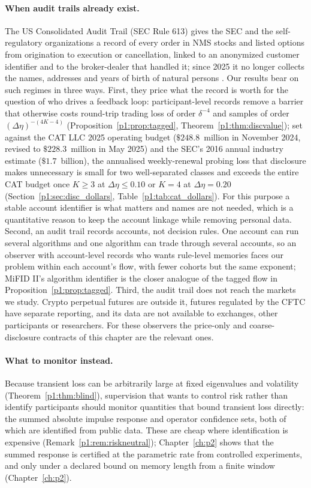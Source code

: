 \paragraph{When audit trails already exist.} The US Consolidated Audit Trail (SEC Rule 613) gives the SEC and the self-regulatory organizations a record of every order in NMS stocks and listed options from origination to execution or cancellation, linked to an anonymized customer identifier and to the broker-dealer that handled it; since 2025 it no longer collects the names, addresses and years of birth of natural persons \citep{p1:sec2012,p1:sec2016,p1:sec2024cat,p1:sec2025}. Our results bear on such regimes in three ways. First, they price what the record is worth for the question of who drives a feedback loop: participant-level records remove a barrier that otherwise costs round-trip trading loss of order $\delta^{-4}$ and samples of order $(\Delta\eta)^{-(4K-4)}$ (Proposition~\ref{p1:prop:tagged}, Theorem~\ref{p1:thm:discvalue}); set against the CAT LLC 2025 operating budget ($\$248.8$~million in November 2024, revised to $\$228.3$~million in May 2025) and the SEC's 2016 annual industry estimate ($\$1.7$~billion), the annualised weekly-renewal probing loss that disclosure makes unnecessary is small for two well-separated classes and exceeds the entire CAT budget once $K\ge3$ at $\Delta\eta\le0.10$ or $K=4$ at $\Delta\eta=0.20$ (Section~\ref{p1:sec:disc_dollars}, Table~\ref{p1:tab:cat_dollars}). For this purpose a stable account identifier is what matters and names are not needed, which is a quantitative reason to keep the account linkage while removing personal data. Second, an audit trail records accounts, not decision rules. One account can run several algorithms and one algorithm can trade through several accounts, so an observer with account-level records who wants rule-level memories faces our problem within each account's flow, with fewer cohorts but the same exponent; MiFID II's algorithm identifier \citep{p1:esma2016} is the closer analogue of the tagged flow in Proposition~\ref{p1:prop:tagged}. Third, the audit trail does not reach the markets we study. Crypto perpetual futures are outside it, futures regulated by the CFTC have separate reporting, and its data are not available to exchanges, other participants or researchers. For these observers the price-only and coarse-disclosure contracts of this chapter are the relevant ones.

\paragraph{What to monitor instead.} Because transient loss can be arbitrarily large at fixed eigenvalues and volatility (Theorem~\ref{p1:thm:blind}), supervision that wants to control risk rather than identify participants should monitor quantities that bound transient loss directly: the summed absolute impulse response and operator confidence sets, both of which are identified from public data. These are cheap where identification is expensive (Remark~\ref{p1:rem:riskneutral}); Chapter~\ref{ch:p2} shows that the summed response is certified at the parametric rate from controlled experiments, and only under a declared bound on memory length from a finite window (Chapter~\ref{ch:p2}).


